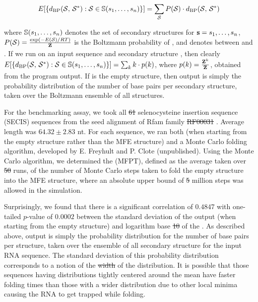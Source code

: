 \documentclass[11pt, oneside]{Thesis} %
\providecommand{\DIFadd}[1]{{\protect\color{blue}\uwave{#1}}} %
\providecommand{\DIFdel}[1]{{\protect\color{red}\sout{#1}}}                      %
\providecommand{\DIFaddbegin}{} %
\providecommand{\DIFaddend}{} %
\providecommand{\DIFdelbegin}{} %
\providecommand{\DIFdelend}{} %
\begin{document}
\begin{align}
E[ \{ d_{\text{BP}}(\mathcal S,\,\mathcal S^*) : \mathcal S \in \mathbb{S}(s_1,\dots,s_n)\} ] =
\sum_{\mathcal S} P(\mathcal S) \cdot d_{\text{BP}}(\mathcal S,\,\mathcal S^*)
\end{align}

where
$\mathbb{S}(s_1,\dots,s_n)$ denotes the set of secondary structures for
${\bf s} = s_1,\dots,s_n$, $P(\mathcal S) = \frac{\exp(-E(\mathcal S)/RT)}{{\bf Z}^{}_{}}$ is the Boltzmann
probability of \str, and
\dBP{\str}{\strSt} denotes \bpd between \str and \strSt.
If we run \fftbor on an input sequence \seq and secondary structure
\strSt, then clearly
$E[ \{ d_{\text{BP}}(\mathcal S,\,\mathcal S^*) : \mathcal S \in \mathbb{S}(s_1,\dots,s_n)\} ] =
\sum_{k} k \cdot p(k)$, where $p(k)=\frac{{\bf Z}^{k}_{}}{{\bf Z}^{}_{}}$, obtained from the
program output.  If \strSt is the empty structure, then \fftbor output
is simply the probability distribution of the number of base pairs per
secondary structure, taken over the Boltzmann ensemble of all structures.

For the benchmarking assay, we took all \DIFdelbegin \DIFdel{61 }\DIFdelend \DIFaddbegin \DIFadd{$61$ }\DIFaddend selenocysteine insertion sequence
(SECIS) sequences from the seed alignment of Rfam family \DIFdelbegin \DIFdel{RF00031
}\DIFdelend \DIFaddbegin \DIFadd{RF$00031$
}\DIFaddend \citep{Gardner.nar11}. Average length was $64.32 \pm 2.83$ nt.
For each sequence, we ran both \fftbor (when starting
from the empty structure rather than the MFE structure) and a Monte Carlo
folding algorithm, developed by E. Freyhult and P. Clote (unpublished).
Using the Monte Carlo algorithm, we
determined the \mfpt (MFPT), defined as the average
taken over \DIFdelbegin \DIFdel{50 }\DIFdelend \DIFaddbegin \DIFadd{$50$ }\DIFaddend runs, of the number of Monte Carlo steps taken to fold
the empty structure into the MFE structure, where an absolute upper bound
of \DIFdelbegin \DIFdel{5 }\DIFdelend \DIFaddbegin \DIFadd{$5$ }\DIFaddend million steps was allowed in the simulation.

Surprisingly, we found that there is a significant
correlation of $0.4847$ with one-tailed
$p$-value of $0.0002$ between the
standard deviation of the \fftbor output (when starting from the
empty structure) and logarithm base \DIFdelbegin \DIFdel{10 }\DIFdelend \DIFaddbegin \DIFadd{$10$ }\DIFaddend of the \mfpt.
As described above, \fftbor output is simply
the probability distribution
for the number of base pairs per structure, taken over the ensemble
of all secondary structure for the input RNA
sequence. The standard deviation of this probability distribution corresponds
to a notion of the \DIFdelbegin %
\DIFdel{width }%
\DIFdelend \DIFaddbegin \DIFadd{width }\DIFaddend of the distribution. It is possible that those
sequences having distributions tightly centered around the
mean have faster folding times than those with a wider distribution
due to other local minima causing the RNA to get trapped while folding.
\end{document}
